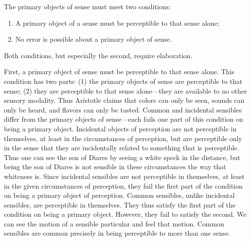 The primary objects of sense must meet two conditions: 
\begin{enumerate}[(1)]
	\item A primary object of a sense must be perceptible to that sense alone;
	\item No error is possible about a primary object of sense.
\end{enumerate}
Both conditions, but especially the second, require elaboration.

First, a primary object of sense must be perceptible to that sense alone. This condition has two parts: (1) the primary objects of sense are perceptible to that sense; (2) they are perceptible to that sense alone---they are available to no other sensory modality. Thus Aristotle claims that colors can only be seen, sounds can only be heard, and flavors can only be tasted. Common and incidental sensibles differ from the primary objects of sense---each fails one part of this condition on being a primary object. Incidental objects of perception are not perceptible in themselves, at least in the circumstances of perception, but are perceptible only in the sense that they are incidentally related to something that is perceptible. Thus one can see the son of Diares by seeing a white speck in the distance, but being the son of Diares is not sensible in these circumstances the way that whiteness is. Since incidental sensibles are not perceptible in themselves, at least in the given circumstances of perception, they fail the first part of the condition on being a primary object of perception. Common sensibles, unlike incidental sensibles, are perceptible in themselves. They thus satisfy the first part of the condition on being a primary object. However, they fail to satisfy the second. We can see the motion of a sensible particular and feel that motion. Common sensibles are common precisely in being perceptible to more than one sense.


